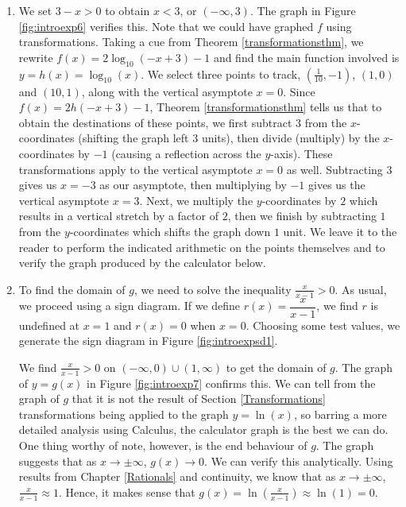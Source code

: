{
\begin{enumerate}

\item  We set $3-x > 0$ to obtain $x<3$, or $(-\infty, 3)$.  The graph in Figure \ref{fig:introexp6} verifies this.  Note that we could have graphed $f$ using transformations.  Taking a cue from Theorem \ref{transformationsthm}, we rewrite $f(x) = 2 \log_{10}(-x+3) -1$ and find the main function involved is $y = h(x) = \log_{10}(x)$.  We select three points to track,  $\left(\frac{1}{10}, -1\right)$, $(1,0)$ and $(10,1)$, along with the vertical asymptote $x=0$.   Since $f(x) = 2h(-x+3)-1$, Theorem \ref{transformationsthm} tells us that to obtain the destinations of these points, we first subtract $3$ from the $x$-coordinates (shifting the graph left $3$ units), then divide (multiply) by the $x$-coordinates by $-1$ (causing a reflection across the $y$-axis).  These transformations apply to the vertical asymptote $x = 0$ as well.  Subtracting $3$ gives us $x=-3$ as our asymptote, then multiplying by $-1$ gives us the vertical asymptote $x=3$.  Next, we multiply the $y$-coordinates by $2$ which results in a vertical stretch by a factor of $2$, then we finish by subtracting $1$ from the $y$-coordinates which shifts the graph down $1$ unit.  We leave it to the reader to perform the indicated arithmetic on the points themselves and to verify the graph produced by the calculator below.


\item  To find the domain of $g$, we need to solve the inequality $\frac{x}{x-1} > 0$. As usual, we proceed using a sign diagram.  If we define $r(x) = \dfrac{x}{x-1}$, we find $r$ is undefined at $x=1$ and $r(x) = 0$ when $x=0$.  Choosing some test values, we generate the sign diagram in Figure \ref{fig:introexpsd1}.  



We find $ \frac{x}{x-1} > 0$ on $(-\infty, 0) \cup (1, \infty)$ to get the domain of $g$.  The graph of $y=g(x)$ in Figure \ref{fig:introexp7} confirms this.  We can tell from the graph of $g$ that it is not the result of Section \ref{Transformations} transformations being applied to the graph $y = \ln(x)$, so barring a more detailed analysis using Calculus, the calculator graph is the best we can do.  One thing worthy of note, however, is the end behaviour of $g$.  The graph suggests that as $x \rightarrow \pm \infty$, $g(x) \rightarrow 0$.  We can verify this analytically.  Using results  from Chapter \ref{Rationals} and continuity, we know that as $x \rightarrow \pm \infty$, $\frac{x}{x-1} \approx 1$.  Hence, it makes sense that $g(x) = \ln \left(\frac{x}{x-1}\right) \approx \ln(1) = 0$.

\end{enumerate}
}

